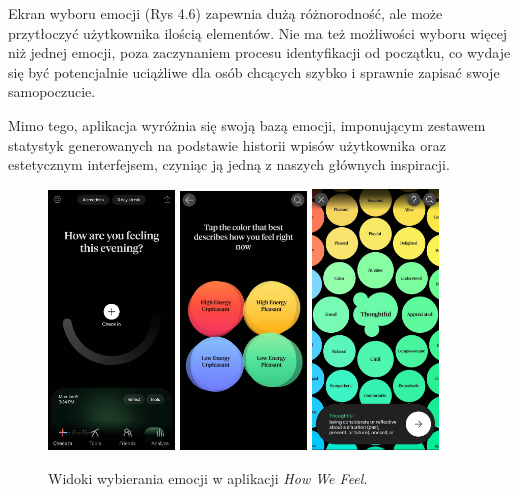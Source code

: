\documentclass[inz, shortabstract]{iithesis}
\begin{document}
Ekran wyboru emocji (Rys 4.6) zapewnia dużą różnorodność, ale może przytłoczyć użytkownika ilością elementów. Nie ma też możliwości wyboru więcej niż jednej emocji, poza zaczynaniem procesu identyfikacji od początku, co wydaje się być potencjalnie uciążliwe dla osób chcących szybko i sprawnie zapisać swoje samopoczucie. 

Mimo tego, aplikacja wyróżnia się swoją bazą emocji, imponującym zestawem statystyk generowanych na podstawie historii wpisów użytkownika oraz estetycznym interfejsem, czyniąc ją jedną z naszych głównych inspiracji.

\begin{figure}[!t]
\centering
\includegraphics[width=0.3\textwidth]{howwefeel1.jpg} 
\includegraphics[width=0.3\textwidth]{howwefeel2.jpg} 
\includegraphics[width=0.3\textwidth]{howwefeel3.jpg} 
\caption{Widoki wybierania emocji w aplikacji \textit{How We Feel}.}
\end{figure}
\end{document}
